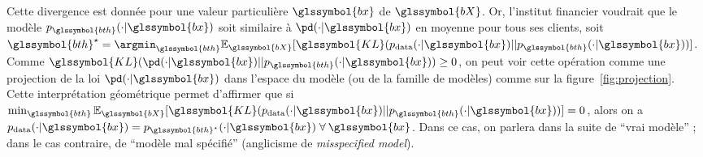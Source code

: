 Cette divergence est donnée pour une valeur particulière $\glssymbol{bx}$ de $\glssymbol{bX}$. Or, l'institut financier voudrait que le modèle $p_{\glssymbol{bth}}(\cdot | \glssymbol{bx})$ soit similaire à $\pd(\cdot | \glssymbol{bx})$ en moyenne pour tous ses clients, soit ${\glssymbol{bth}}^\star = \argmin_{\glssymbol{bth}} \mathbb{E}_{\glssymbol{bX}} [\glssymbol{KL}(p_{\text{data}}(\cdot | \glssymbol{bx})||p_{\glssymbol{bth}}(\cdot | \glssymbol{bx}))]$. Comme $\glssymbol{KL}(\pd(\cdot | \glssymbol{bx})||p_{\glssymbol{bth}}(\cdot | \glssymbol{bx})) \geq 0$, on peut voir cette opération comme une projection de la loi $\pd(\cdot | \glssymbol{bx})$ dans l'espace du modèle (ou de la famille de modèles) comme sur la figure~\ref{fig:projection}. Cette interprétation géométrique permet d'affirmer que si $\min_{\glssymbol{bth}} \mathbb{E}_{\glssymbol{bX}} [\glssymbol{KL}(p_{\text{data}}(\cdot | \glssymbol{bx})||p_{\glssymbol{bth}}(\cdot | \glssymbol{bx}))] = 0$, alors on a $p_{\text{data}}(\cdot | \glssymbol{bx}) = p_{\glssymbol{bth}^\star}(\cdot | \glssymbol{bx}) \; \forall \: \glssymbol{bx}$. Dans ce cas, on parlera dans la suite de ``vrai modèle'' ; dans le cas contraire, de ``modèle mal spécifié'' (anglicisme de \textit{misspecified model}).

